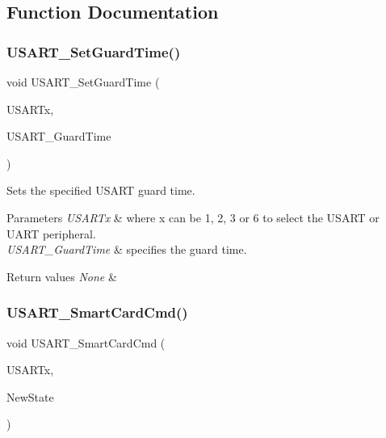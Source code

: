 \subsection{Function Documentation}
\mbox{\label{group___u_s_a_r_t___group6_gac4a35c6acd71ae7e0d67c1f03f0a8777}} 
\subsubsection{\texorpdfstring{U\+S\+A\+R\+T\+\_\+\+Set\+Guard\+Time()}{USART\_SetGuardTime()}}
{\footnotesize\ttfamily void U\+S\+A\+R\+T\+\_\+\+Set\+Guard\+Time (\begin{DoxyParamCaption}\item[{U\+S\+A\+R\+T\+\_\+\+Type\+Def $\ast$}]{U\+S\+A\+R\+Tx,  }\item[{uint8\+\_\+t}]{U\+S\+A\+R\+T\+\_\+\+Guard\+Time }\end{DoxyParamCaption})}



Sets the specified U\+S\+A\+RT guard time. 


\begin{DoxyParams}{Parameters}
{\em U\+S\+A\+R\+Tx} & where x can be 1, 2, 3 or 6 to select the U\+S\+A\+RT or U\+A\+RT peripheral. \\
\hline
{\em U\+S\+A\+R\+T\+\_\+\+Guard\+Time} & specifies the guard time. ~\newline
\\
\hline
\end{DoxyParams}

\begin{DoxyRetVals}{Return values}
{\em None} & \\
\hline
\end{DoxyRetVals}
\mbox{\label{group___u_s_a_r_t___group6_gabd1347e244c623447151ba3a5e986c5f}} 
\subsubsection{\texorpdfstring{U\+S\+A\+R\+T\+\_\+\+Smart\+Card\+Cmd()}{USART\_SmartCardCmd()}}
{\footnotesize\ttfamily void U\+S\+A\+R\+T\+\_\+\+Smart\+Card\+Cmd (\begin{DoxyParamCaption}\item[{U\+S\+A\+R\+T\+\_\+\+Type\+Def $\ast$}]{U\+S\+A\+R\+Tx,  }\item[{Functional\+State}]{New\+State }\end{DoxyParamCaption})}



